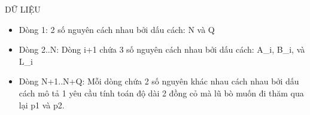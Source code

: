 DỮ LIỆU  
\begin{itemize}
	\item     Dòng 1: 2 số nguyên cách nhau bởi dấu cách: N và Q   
	\item     Dòng 2..N: Dòng i+1 chứa 3 số nguyên cách nhau bởi dấu cách: A\_i,         B\_i, và L\_i   
	\item     Dòng N+1..N+Q: Mỗi dòng chứa 2 số nguyên khác nhau cách nhau bởi dấu cách         mô tả 1 yêu cầu tính toán độ dài 2 đồng cỏ mà lũ bò muốn đi thăm qua lại p1 và p2.   
\end{itemize}